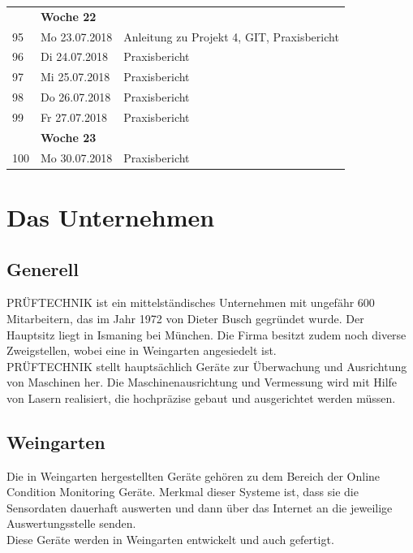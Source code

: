 \documentclass{article}
\begin{document}
{\begin{tabular}{l|p{2.5cm}|p{15cm}}
			


			& \textbf{Woche 22}&\\

			
			
			95 & Mo 23.07.2018  & 
			Anleitung zu Projekt 4, GIT, Praxisbericht\\

			96 & Di 24.07.2018	  & 
			Praxisbericht\\

			97 & Mi 25.07.2018	 & 
			Praxisbericht\\

			98 & Do 26.07.2018  & 
			Praxisbericht\\

			99 & Fr 27.07.2018 & 
			Praxisbericht\\

			


			& \textbf{Woche 23}&\\

				
			100 & Mo 30.07.2018  & 
			Praxisbericht\\




		
	\end{tabular}

\newpage


\section{Das Unternehmen}
	\subsection{Generell}

		PRÜFTECHNIK ist ein mittelständisches Unternehmen mit ungefähr 600 Mitarbeitern, das im Jahr 1972 von Dieter Busch gegründet wurde. Der Hauptsitz liegt in Ismaning bei München. Die Firma besitzt zudem noch diverse Zweigstellen, wobei eine in Weingarten angesiedelt ist.\\
		PRÜFTECHNIK stellt hauptsächlich Geräte zur Überwachung und Ausrichtung von Maschinen her. Die Maschinenausrichtung und Vermessung wird mit Hilfe von Lasern realisiert, die hochpräzise gebaut und ausgerichtet werden müssen. \\


	\subsection{Weingarten}
		Die in Weingarten hergestellten Geräte gehören zu dem Bereich der Online Condition Monitoring Geräte.
		Merkmal dieser Systeme ist, dass sie die Sensordaten dauerhaft auswerten und dann über das Internet an die jeweilige Auswertungsstelle senden.\\ Diese Geräte werden in Weingarten entwickelt und auch gefertigt.

}
\end{document}
